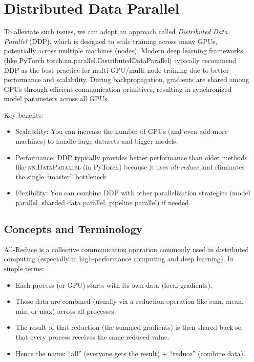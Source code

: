 \section{Distributed Data Parallel}
\label{sec:parallelism:data_parallelism:ddp}
To alleviate such issues, we can adopt an approach called \textit{Distributed Data Parallel} (DDP), which is designed to scale training across many GPUs, potentially across multiple machines (nodes). Modern deep learning frameworks (like PyTorch torch.nn.parallel.DistributedDataParallel) typically recommend DDP as the best practice for multi-GPU/multi-node training due to better performance and scalability. During backpropagation, gradients are shared among GPUs through efficient communication primitives, resulting in synchronized model parameters across all GPUs.

Key benefits:
\begin{itemize}
	\item Scalability: You can increase the number of GPUs (and even add more machines) to handle large datasets and bigger models.
	\item Performance: DDP typically provides better performance than older methods like \textsc{nn.DataParallel} (in PyTorch) because it uses \textit{all-reduce} and eliminates the single ``master'' bottleneck.
	\item Flexibility: You can combine DDP with other parallelization strategies (\eg model parallel, sharded data parallel, pipeline parallel) if needed.
\end{itemize}

\subsection{Concepts and Terminology}

All-Reduce is a collective communication operation commonly used in distributed computing (especially in high-performance computing and deep learning). In simple terms:
\begin{itemize}
	\item Each process (or GPU) starts with its own data (\eg local gradients).
	\item These data are combined (usually via a reduction operation like sum, mean, min, or max) across all processes.
	\item The result of that reduction (\eg the summed gradients) is then shared back so that every process receives the same reduced value.
	\item Hence the name: ``all'' (everyone gets the result) + ``reduce'' (combine data).
\end{itemize}

